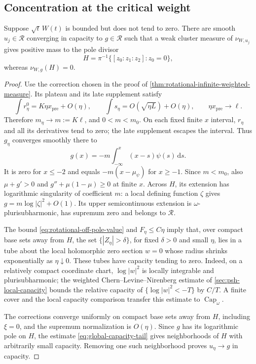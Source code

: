 \subsection{Concentration at the critical weight}

\begin{lemma}\label{lem:rotational-critical-concentration}
Suppose $\sqrt t\,W(t)$ is bounded but does not tend to zero. There are smooth $u_j\in\mathcal R$ converging in capacity to $g\in\mathcal R$ such that a weak cluster measure of $\nu_{W,u_j}$ gives positive mass to the pole divisor
\[
 H=\pi^{-1}\{[z_0:z_1:z_2]:z_0=0\},
\]
whereas $\nu_{W,g}(H)=0$.
\end{lemma}
\begin{proof}
Use the correction chosen in the proof of \cref{thm:rotational-infinite-weighted-measure}. Its plateau and its late supplement satisfy
\[
 \int r^0_\eta=K\eta x_{\mathrm{pre}}+O(\eta),\qquad
 \int s_\eta=O(\sqrt{\eta L})+O(\eta),\qquad
 \eta x_{\mathrm{pre}}\to\ell.
\]
Therefore $m_\eta\to m:=K\ell$, and $0<m<m_0$. On each fixed finite
$x$ interval, $r_\eta$ and all its derivatives tend to zero; the late
supplement escapes the interval. Thus $g_\eta$ converges smoothly there to
\[
 g(x)=-m\int_{-\infty}^x(x-s)\psi(s)\,\mathrm ds.
\]
It is zero for $x\leq-2$ and equals $-m(x-\mu_\psi)$ for $x\geq-1$.
Since $m<m_0$, also $\mu+g'>0$ and
$g''+\mu(1-\mu)\geq0$ at finite $x$.
Across $H$, its extension has logarithmic singularity of coefficient $m$: a local defining function $\zeta$ gives $g=m\log|\zeta|^2+O(1)$.
Its upper semicontinuous extension is $\omega$-plurisubharmonic, has supremum zero and belongs to $\mathcal R$.

The bound \eqref{eq:rotational-off-pole-value} and $F_\eta\leq C\eta$ imply that, over compact base sets away from $H$, the set $\{|Z_\eta|>\delta\}$, for fixed $\delta>0$ and small $\eta$, lies in a tube about the local holomorphic zero section $w=0$ whose radius shrinks exponentially as $\eta\downarrow0$. These tubes have capacity tending to zero. Indeed, on a relatively compact coordinate chart, $\log|w|^2$ is locally integrable and plurisubharmonic; the weighted Chern--Levine--Nirenberg estimate of \cref{sec:psh-local-capacity} bounds the relative capacity of $\{\log|w|^2<-T\}$ by $C/T$. A finite cover and the local capacity comparison transfer this estimate to $\operatorname{Cap}_\omega$.

The corrections converge uniformly on compact base sets away from $H$, including $\xi=0$, and the supremum normalization is $O(\eta)$. Since $g$ has its logarithmic pole on $H$, the estimate \eqref{eq:global-capacity-tail} gives neighborhoods of $H$ with arbitrarily small capacity. Removing one such neighborhood proves $u_\eta\to g$ in capacity.


\end{proof}
